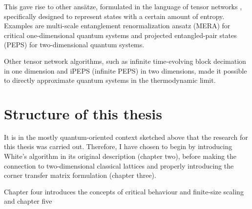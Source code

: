 This gave rise to other ansätze, formulated in the language of tensor
networks \cite{orus2014practical}, specifically designed to represent
states with a certain amount of entropy. Examples are multi-scale
entanglement renormalization ansatz (MERA) for critical one-dimensional
quantum systems \cite{vidal2007entanglement} and projected entangled-pair
states (PEPS) \cite{verstraete2004renormalization}
for two-dimensional quantum systems.

Other tensor network algorithms, such as infinite time-evolving block
decimation \cite{vidal2007classical} in one dimension and iPEPS (infinite
PEPS) \cite{jordan2008classical} in two dimensions, made it possible to
directly approximate quantum systems in the thermodynamic limit.



\section{Structure of this thesis}

It is in the mostly quantum-oriented context sketched above that the
research for this thesis was carried out. Therefore, I have chosen to
begin by introducing White's algorithm in its original description
(chapter two), before making the connection to two-dimensional classical
lattices and properly introducing the corner transfer matrix formulation
(chapter three).

Chapter four introduces the concepts of critical behaviour and finite-size
scaling and chapter five 



%
%
%
%
%

